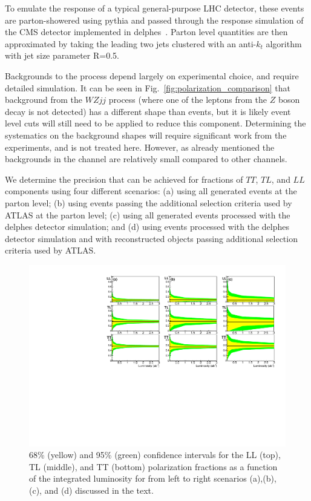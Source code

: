 To emulate the response of a typical general-purpose LHC detector, these events are parton-showered using {\sc pythia}\cite{pythia} and passed through the  response simulation of the CMS detector implemented in {\sc delphes}~\cite{delphes}. Parton level quantities are then approximated by taking the leading two jets clustered with an anti-$k_t$ algorithm~\cite{antikt} with jet size parameter R=0.5.

Backgrounds to the \ssWW process depend largely on experimental choice, and require detailed simulation. It can be seen in Fig.~\ref{fig:polarization_comparison} that background from the $WZjj$ process (where one of 
the leptons from the $Z$ boson decay is not detected) has a different \ctsNN shape than \ssWW events, but it is likely event level cuts will still need to be applied to reduce this component. Determining the systematics on the background shapes will require significant work from the experiments, and is not treated here. However, as already mentioned the backgrounds in the \ssWW channel are relatively small compared to other channels.

We determine the precision that can be achieved for fractions of $TT$, $TL$, and $LL$ components using four different scenarios: (a) using all  generated events at the parton level; 
(b) using events passing the additional selection criteria used by ATLAS at the parton level; 
(c) using all generated events processed with the {\sc delphes} detector simulation; and (d) using events processed with the {\sc delphes} detector simulation and with reconstructed objects passing additional selection criteria used by \mbox{ATLAS}. 

\begin{figure}
\includegraphics[width=.9\textwidth]{./fig/12_LL_LT_TT.pdf}
\caption{ \label{fig:sensitivity} 68\% (yellow) and 95\% (green) confidence intervals for the LL (top), TL (middle), and TT (bottom) polarization fractions as a function of the integrated luminosity for from left to right scenarios (a),(b),(c), and (d) discussed in the text. }
\end{figure}

